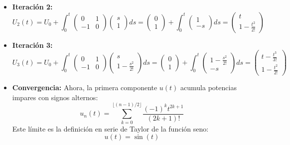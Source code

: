 {\begin{enumerate} [label=\alph*)]
\begin{itemize}
                \item \textbf{Iteración 2:}
                $$U_2(t) = U_0 + \int_0^t \begin{pmatrix} 0 & 1 \\ -1 & 0 \end{pmatrix} \begin{pmatrix} s \\ 1 \end{pmatrix} ds = \begin{pmatrix} 0 \\ 1 \end{pmatrix} + \int_0^t \begin{pmatrix} 1 \\ -s \end{pmatrix} ds = \begin{pmatrix} t \\ 1 - \frac{t^2}{2!} \end{pmatrix}$$
                \item \textbf{Iteración 3:}
                $$U_3(t) = U_0 + \int_0^t \begin{pmatrix} 0 & 1 \\ -1 & 0 \end{pmatrix} \begin{pmatrix} s \\ 1 - \frac{s^2}{2!} \end{pmatrix} ds = \begin{pmatrix} 0 \\ 1 \end{pmatrix} + \int_0^t \begin{pmatrix} 1 - \frac{s^2}{2!} \\ -s \end{pmatrix} ds = \begin{pmatrix} t - \frac{t^3}{3!} \\ 1 - \frac{t^2}{2!} \end{pmatrix}$$
                \item \textbf{Convergencia:} Ahora, la primera componente $u(t)$ acumula potencias impares con signos alternos:
                $$u_n(t) = \sum_{k=0}^{\lfloor (n-1)/2 \rfloor} \frac{(-1)^k t^{2k+1}}{(2k+1)!}$$
                Este límite es la definición en serie de Taylor de la función seno:
                $$u(t) = \sin(t)$$
            \end{itemize}                           
    \end{enumerate}
}




